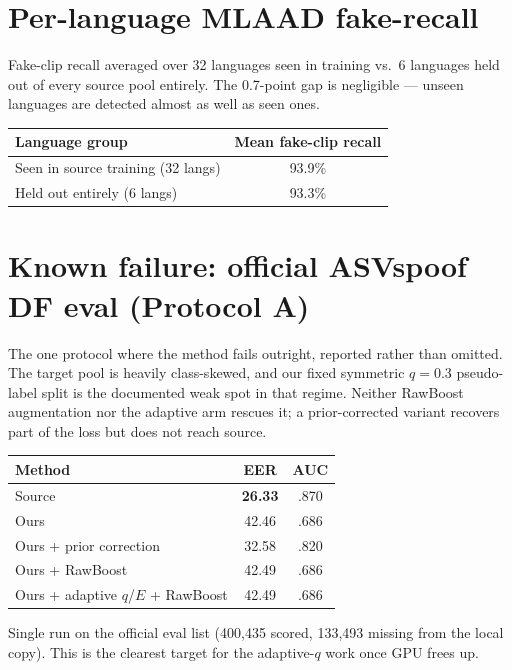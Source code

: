 \documentclass[11pt]{article}
\begin{document}
\section*{Per-language MLAAD fake-recall}
Fake-clip recall averaged over 32 languages seen in training vs.\ 6 languages
held out of every source pool entirely. The 0.7-point gap is negligible ---
unseen languages are detected almost as well as seen ones.
\begin{table}[h]
\centering
\begin{tabular}{@{}lc@{}}
\toprule
Language group & Mean fake-clip recall \\
\midrule
Seen in source training (32 langs) & 93.9\% \\
Held out entirely (6 langs) & 93.3\% \\
\bottomrule
\end{tabular}
\end{table}

\section*{Known failure: official ASVspoof DF eval (Protocol A)}
The one protocol where the method fails outright, reported rather than omitted.
The target pool is heavily class-skewed, and our fixed symmetric $q=0.3$
pseudo-label split is the documented weak spot in that regime. Neither RawBoost
augmentation nor the adaptive arm rescues it; a prior-corrected variant recovers
part of the loss but does not reach source.
\begin{table}[h]
\centering
\begin{tabular}{@{}lcc@{}}
\toprule
Method & EER & AUC \\
\midrule
Source & \textbf{26.33} & .870 \\
Ours & \cellcolor{red!10}42.46 & .686 \\
Ours + prior correction & 32.58 & .820 \\
Ours + RawBoost & 42.49 & .686 \\
Ours + adaptive $q$/$E$ + RawBoost & 42.49 & .686 \\
\bottomrule
\end{tabular}
\end{table}

Single run on the official eval list (400{,}435 scored, 133{,}493 missing from
the local copy). This is the clearest target for the adaptive-$q$ work once GPU
frees up.
\end{document}
